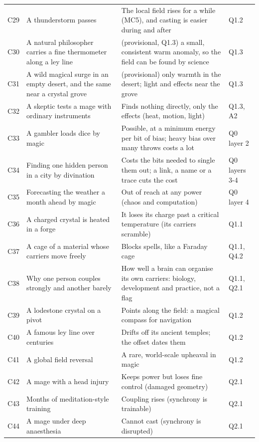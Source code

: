 \begin{longtable}{@{}>{\raggedright\arraybackslash}p{}>{\raggedright\arraybackslash}p{}>{\raggedright\arraybackslash}p{}>{\raggedright\arraybackslash}p{}@{}}
C29 & A thunderstorm passes & The local field rises for a while (MC5), and casting is easier during and after & Q1.2\\
C30 & A natural philosopher carries a fine thermometer along a ley line & (provisional, Q1.3) a small, consistent warm anomaly, so the field can be found by science & Q1.3\\
C31 & A wild magical surge in an empty desert, and the same near a crystal grove & (provisional) only warmth in the desert; light and effects near the grove & Q1.3\\
C32 & A skeptic tests a mage with ordinary instruments & Finds nothing directly, only the effects (heat, motion, light) & Q1.3, A2\\
C33 & A gambler loads dice by magic & Possible, at a minimum energy per bit of bias; heavy bias over many throws costs a lot & Q0 layer 2\\
C34 & Finding one hidden person in a city by divination & Costs the bits needed to single them out; a link, a name or a trace cuts the cost & Q0 layers 3-4\\
C35 & Forecasting the weather a month ahead by magic & Out of reach at any power (chaos and computation) & Q0 layer 4\\
C36 & A charged crystal is heated in a forge & It loses its charge past a critical temperature (its carriers scramble) & Q1.1\\
C37 & A cage of a material whose carriers move freely & Blocks spells, like a Faraday cage & Q1.1, Q4.2\\
C38 & Why one person couples strongly and another barely & How well a brain can organise its own carriers: biology, development and practice, not a flag & Q1.1, Q2.1\\
C39 & A lodestone crystal on a pivot & Points along the field: a magical compass for navigation & Q1.2\\
C40 & A famous ley line over centuries & Drifts off its ancient temples; the offset dates them & Q1.2\\
C41 & A global field reversal & A rare, world-scale upheaval in magic & Q1.2\\
C42 & A mage with a head injury & Keeps power but loses fine control (damaged geometry) & Q2.1\\
C43 & Months of meditation-style training & Coupling rises (synchrony is trainable) & Q2.1\\
C44 & A mage under deep anaesthesia & Cannot cast (synchrony is disrupted) & Q2.1\\

\end{longtable}
